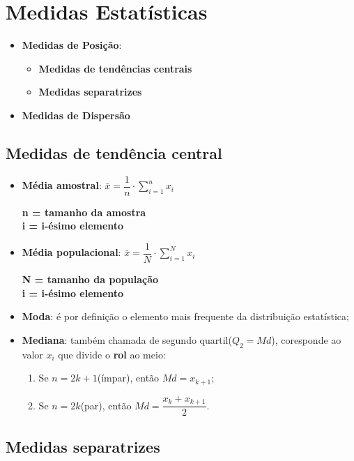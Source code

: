 \section{Medidas Estatísticas}

\begin{itemize}
	\item \textbf{Medidas de Posição}:
		\begin{itemize}
			\item \textbf{Medidas de tendências centrais}
			\item \textbf{Medidas separatrizes}
		\end{itemize}
	\item \textbf{Medidas de Dispersão}
\end{itemize}

\subsection{Medidas de tendência central}

\begin{itemize}
	\item \textbf{Média amostral}: $\bar{x} = \dfrac{1}{n} \cdot \sum_{i=1}^{n}x_i$
	
		\textbf{n = tamanho da amostra}\\
		\textbf{i = i-ésimo elemento}
		
	\item \textbf{Média populacional}: $\bar{x} = \dfrac{1}{N} \cdot \sum_{i=1}^{N}x_i$
	
		\textbf{N = tamanho da população}\\
		\textbf{i = i-ésimo elemento}
	\item \textbf{Moda}: é por definição o elemento mais frequente da distribuição estatística;
	
	\item \textbf{Mediana}: também chamada de segundo quartil($Q_2=Md$), coresponde ao valor $x_i$ que divide o \textbf{rol} ao meio:
	\begin{enumerate}[i]
		\item Se $n=2k+1$(ímpar), então $Md = x_{k+1}$;
		\item Se $n=2k$(par), então $Md = \dfrac{x_k + x_{k+1}}{2}$.
	\end{enumerate}
\end{itemize}

\subsection{Medidas separatrizes}

